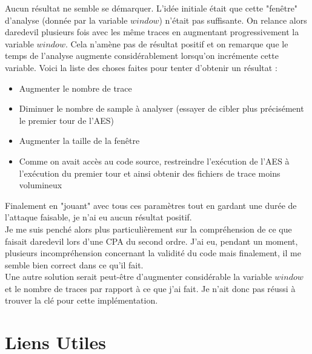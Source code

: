 \documentclass[10pt,a4paper]{article}
\begin{document}
Aucun résultat ne semble se démarquer. L'idée initiale était que cette "fenêtre" d'analyse (donnée par la variable $window$) n'était pas suffisante. On relance alors daredevil plusieurs fois avec les même traces en augmentant progressivement la variable $window$. Cela n'amène pas de résultat positif et on remarque que le temps de l'analyse augmente considérablement lorsqu'on incrémente cette variable. Voici la liste des choses faites pour tenter d'obtenir un résultat :

\begin{itemize}
\item Augmenter le nombre de trace
\item Diminuer le nombre de sample à analyser (essayer de cibler plus précisément le premier tour de l'AES)
\item Augmenter la taille de la fenêtre
\item Comme on avait accès au code source, restreindre l'exécution de l'AES à l'exécution du premier tour et ainsi obtenir des fichiers de trace moins volumineux\\
\end{itemize}
Finalement en "jouant" avec tous ces paramètres tout en gardant une durée de l'attaque faisable, je n'ai eu aucun résultat positif.\\
Je me suis penché alors plus particulièrement sur la compréhension de ce que faisait daredevil lors d'une CPA du second ordre. J'ai eu, pendant un moment, plusieurs incompréhension concernant la validité du code mais finalement, il me semble bien correct dans ce qu'il fait.\\
Une autre solution serait peut-être d'augmenter considérable la variable $window$ et le nombre de traces par rapport à ce que j'ai fait. Je n'ait donc pas réussi à trouver la clé pour cette implémentation.


\section{Liens Utiles}
\end{document}
